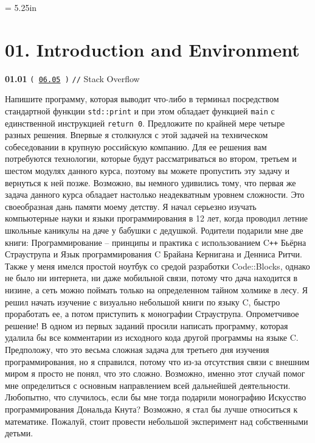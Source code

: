 \documentclass[a4paper,12pt]{article}
\begin{document}
\newpage\thispagestyle{empty}\pdfpageheight = 5.25in

\section{01. Introduction and Environment}

{\large \textbf{01.01} \texttt{(\,\href{https://github.com/i-s-m-mipt/Education/blob/master/projects/examples/source/06.05.hpp}{06.05}\,)} \texttt{//} Stack Overflow} 

\bigskip

Напишите программу, которая выводит что-либо в терминал посредством стандартной функции \lstinline{std::print} и при этом обладает функцией \lstinline{main} с единственной инструкцией \lstinline{return 0}. Предложите по крайней мере четыре разных решения. Впервые я столкнулся с этой задачей на техническом собеседовании в крупную российскую компанию. Для ее решения вам потребуются технологии, которые будут рассматриваться во втором, третьем и шестом модулях данного курса, поэтому вы можете пропустить эту задачу и вернуться к ней позже. Возможно, вы немного удивились тому, что первая же задача данного курса обладает настолько неадекватным уровнем сложности. Это своеобразная дань памяти моему детству. Я начал серьезно изучать компьютерные науки и языки программирования в 12 лет, когда проводил летние школьные каникулы на даче у бабушки с дедушкой. Родители подарили мне две книги: Программирование -- принципы и практика с использованием C\texttt{++} Бьёрна Страуструпа и Язык программирования C Брайана Кернигана и Денниса Ритчи. Также у меня имелся простой ноутбук со средой разработки Code::Blocks, однако не было ни интернета, ни даже мобильной связи, потому что дача находится в низине, а сеть можно поймать только на определенном тайном холмике в лесу. Я решил начать изучение с визуально небольшой книги по языку C, быстро проработать ее, а потом приступить к монографии Страуструпа. Опрометчивое решение! В одном из первых заданий просили написать программу, которая удалила бы все комментарии из исходного кода другой программы на языке C. Предположу, что это весьма сложная задача для третьего дня изучения программирования, но я справился, потому что из-за отсутствия связи с внешним миром я просто не понял, что это сложно. Возможно, именно этот случай помог мне определиться с основным направлением всей дальнейшей деятельности. Любопытно, что случилось, если бы мне тогда подарили монографию Искусство программирования Дональда Кнута? Возможно, я стал бы лучше относиться к математике. Пожалуй, стоит провести небольшой эксперимент над собственными детьми.
\end{document}
